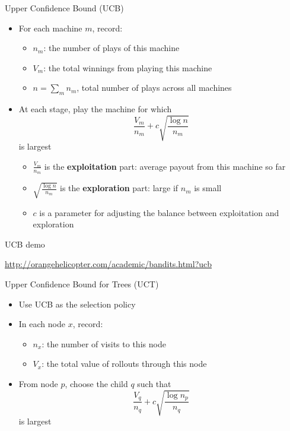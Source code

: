 \begin{frame}{Upper Confidence Bound (UCB)}
	\begin{itemize}
		\pause\item For each machine $m$, record:
			\begin{itemize}
				\pause\item $n_m$: the number of plays of this machine
				\pause\item $V_m$: the total winnings from playing this machine
				\pause\item $n = \sum_m n_m$, total number of plays across all machines
			\end{itemize}
		\pause\item At each stage, play the machine for which
			$$ \frac{V_m}{n_m} + c \sqrt{ \frac{\log n}{n_m} } $$
			is largest
			\begin{itemize}
				\pause\item $\frac{V_m}{n_m}$ is the \textbf{exploitation} part: average payout from this machine so far
				\pause\item $\sqrt{ \frac{\log n}{n_m} }$ is the \textbf{exploration} part: large if $n_m$ is small
				\pause\item $c$ is a parameter for adjusting the balance between exploitation and exploration
			\end{itemize}
	\end{itemize}
\end{frame}

\begin{frame}{UCB demo}
	\begin{center}
		\url{http://orangehelicopter.com/academic/bandits.html?ucb}
	\end{center}
\end{frame}

\begin{frame}{Upper Confidence Bound for Trees (UCT)}
	\begin{itemize}
		\pause\item Use UCB as the selection policy
		\pause\item In each node $x$, record:
			\begin{itemize}
				\pause\item $n_x$: the number of visits to this node
				\pause\item $V_x$: the total value of rollouts through this node
			\end{itemize}
		\pause\item From node $p$, choose the child $q$ such that
			$$ \frac{V_q}{n_q} + c \sqrt{ \frac{\log n_p}{n_q} } $$
			is largest
	\end{itemize}
\end{frame}

